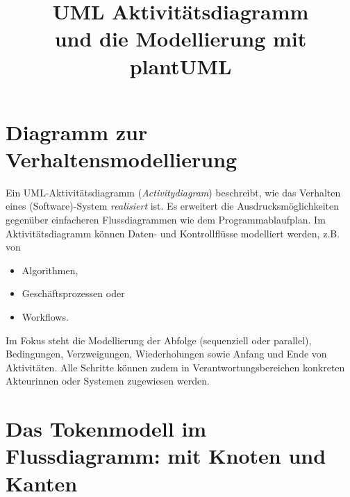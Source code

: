 \documentclass[10pt]{scrartcl}
\title{UML Aktivitätsdiagramm\\
	und die Modellierung mit plantUML
 }
\begin{document}
	\setlength{\droptitle}{-40pt} %
	\maketitle

	




\setcounter{page}{1}

\section{Diagramm zur Verhaltensmodellierung}
Ein UML-Aktivitätsdiagramm (\textit{Activitydiagram}) beschreibt, wie das Verhalten eines (Software)-System \textit{realisiert} ist. Es erweitert die Ausdrucksmöglichkeiten gegenüber einfacheren Flussdiagrammen wie dem Programmablaufplan. Im Aktivitätsdiagramm können Daten- und Kontrollflüsse modelliert werden, z.B. von

\begin{itemize}
	\item Algorithmen,
	\item Geschäftsprozessen oder
	\item Workflows.
\end{itemize}
Im Fokus steht die Modellierung der Abfolge (sequenziell oder parallel), Bedingungen, Verzweigungen, Wiederholungen sowie Anfang und Ende von Aktivitäten. Alle Schritte können zudem in Verantwortungsbereichen konkreten Akteurinnen oder Systemen zugewiesen werden.
\section{Das Tokenmodell im Flussdiagramm: mit Knoten und Kanten}
\end{document}
